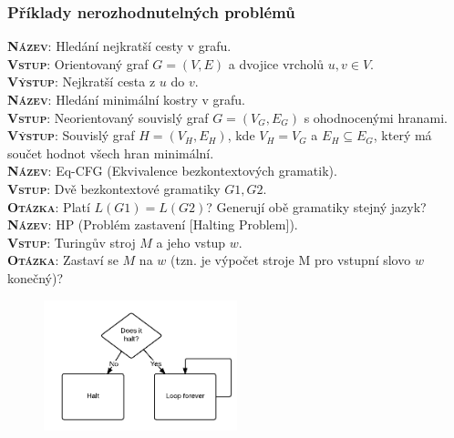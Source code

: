 \subsubsection{Příklady nerozhodnutelných problémů}
\noindent\textbf{\textsc{Název}}: Hledání nejkratší cesty v grafu.\\
\textbf{\textsc{Vstup}}: Orientovaný graf $G = (V, E)$ a dvojice vrcholů $u, v \in V$.\\
\textbf{\textsc{Výstup}}: Nejkratší cesta z $u$ do $v$.\medskip\\

\noindent\textbf{\textsc{Název}}: Hledání minimální kostry v grafu.\\
\textbf{\textsc{Vstup}}: Neorientovaný souvislý graf $G = (V_G,E_G)$ s ohodnocenými hranami. 
\\
\textbf{\textsc{Výstup}}: Souvislý graf $H = (V_H,E_H)$, kde $V_H = V_G$ a $E_H \subseteq E_G$, který má součet hodnot všech hran minimální.
\medskip\\

\noindent\textbf{\textsc{Název}}: Eq-CFG (Ekvivalence bezkontextových gramatik).
\\
\textbf{\textsc{Vstup}}: Dvě bezkontextové gramatiky $G1, G2$.
\\
\textbf{\textsc{Otázka}}: Platí $L(G1) = L(G2)$? Generují obě gramatiky stejný jazyk? \medskip\\

\noindent\textbf{\textsc{Název}}: HP (Problém zastavení [Halting Problem]).
\\
\textbf{\textsc{Vstup}}: Turingův stroj $M$ a jeho vstup $w$.
\\
\textbf{\textsc{Otázka}}: Zastaví se $M$ na $w$ (tzn. je výpočet stroje M pro vstupní slovo $w$ konečný)?
\\


\begin{figure}[H]
	\centering
	\includegraphics[width=0.5\textwidth]{assets/halting}
\end{figure}